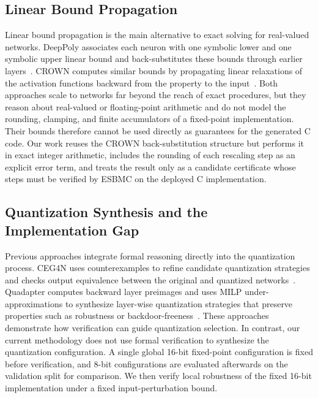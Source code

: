 \subsection{Linear Bound Propagation}

Linear bound propagation is the main alternative to exact solving for real-valued networks. DeepPoly associates each neuron with one symbolic lower and one symbolic upper linear bound and back-substitutes these bounds through earlier layers~\cite{Singh2019DeepPoly}. CROWN computes similar bounds by propagating linear relaxations of the activation functions backward from the property to the input~\cite{Zhang2018CROWN}. Both approaches scale to networks far beyond the reach of exact procedures, but they reason about real-valued or floating-point arithmetic and do not model the rounding, clamping, and finite accumulators of a fixed-point implementation. Their bounds therefore cannot be used directly as guarantees for the generated C code. Our work reuses the CROWN back-substitution structure but performs it in exact integer arithmetic, includes the rounding of each rescaling step as an explicit error term, and treats the result only as a candidate certificate whose steps must be verified by ESBMC on the deployed C implementation.

\subsection{Quantization Synthesis and the Implementation Gap}

Previous approaches integrate formal reasoning directly into the quantization process. CEG4N uses counterexamples to refine candidate quantization strategies and checks output equivalence between the original and quantized networks~\cite{Matos2022CEG4N}. Quadapter computes backward layer preimages and uses MILP under-approximations to synthesize layer-wise quantization strategies that preserve properties such as robustness or backdoor-freeness~\cite{Zhang2024Quadapter}. These approaches demonstrate how verification can guide quantization selection. In contrast, our current methodology does not use formal verification to synthesize the quantization configuration. A single global 16-bit fixed-point configuration is fixed before verification, and 8-bit configurations are evaluated afterwards on the validation split for comparison. We then verify local robustness of the fixed 16-bit implementation under a fixed input-perturbation bound.

